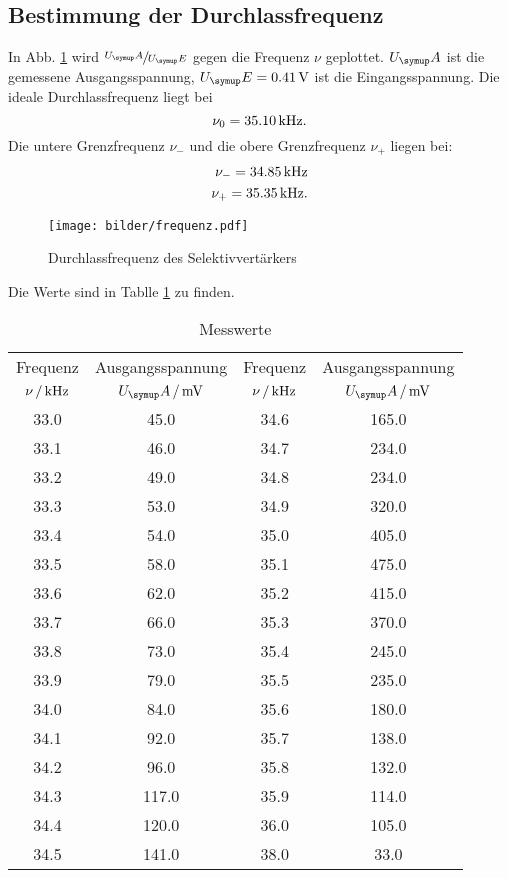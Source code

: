 \subsection{Bestimmung der Durchlassfrequenz}
In Abb. \ref{fig:Durchlass} wird $\sfrac{U_\su{A}}{U_\su{E}}$ gegen die Frequenz
$\nu$ geplottet. $U_\su{A}$ ist die gemessene Ausgangsspannung, $U_\su{E} = 0.41\,\si{\volt}$
ist die Eingangsspannung.
Die ideale Durchlassfrequenz liegt bei
\begin{equation}
  \nu_0 = 35.10 \,\si{\kilo\hertz}.
\end{equation}
Die untere Grenzfrequenz $\nu_-$ und die obere Grenzfrequenz $\nu_+$ liegen bei:
\begin{align}
  \nu_- = 34.85 \,\si{\kilo\hertz} \\
  \nu_+ = 35.35 \,\si{\kilo\hertz}.
\end{align}
\begin{figure}
  \centering
  \texttt{[image: bilder/frequenz.pdf]}
  \caption{Durchlassfrequenz des Selektivvertärkers}
  \label{fig:Durchlass}
\end{figure}
Die Werte sind in Tablle \ref{tab:werte} zu finden.
\newpage
\begin{table}
  \centering
  \begin{tabular}{cc|cc}
    \toprule
    \multicolumn{1}{c}{Frequenz} & \multicolumn{1}{c|}{Ausgangsspannung} &
    \multicolumn{1}{c}{Frequenz} & \multicolumn{1}{c}{Ausgangsspannung} \\
    {$\nu\,/\,\si{\kilo\hertz}$} & {$U_\su{A}\,/\mV$}& {$\nu\,/\,\si{\kilo\hertz}$} & {$U_\su{A}\,/\mV$} \\
    \midrule
       33.0 &   45.0 & 34.6  &   165.0 \\
       33.1 &   46.0 & 34.7  &   234.0 \\
       33.2 &   49.0 & 34.8  &   234.0 \\
       33.3 &   53.0 & 34.9  &   320.0 \\
       33.4 &   54.0 & 35.0  &   405.0 \\
       33.5 &   58.0 & 35.1  &   475.0 \\
       33.6 &   62.0 & 35.2  &   415.0 \\
       33.7 &   66.0 & 35.3  &   370.0 \\
       33.8 &   73.0 & 35.4  &   245.0 \\
       33.9 &   79.0 & 35.5  &   235.0 \\
       34.0 &   84.0 & 35.6  &   180.0 \\
       34.1 &   92.0 & 35.7  &   138.0 \\
       34.2 &   96.0 & 35.8  &   132.0 \\
       34.3 &  117.0 & 35.9  &   114.0 \\
       34.4 &  120.0 & 36.0  &   105.0 \\
       34.5 &  141.0 & 38.0  &    33.0 \\
  \bottomrule
  \end{tabular}
  \caption{Messwerte}
  \label{tab:werte}
\end{table}
\newpage
